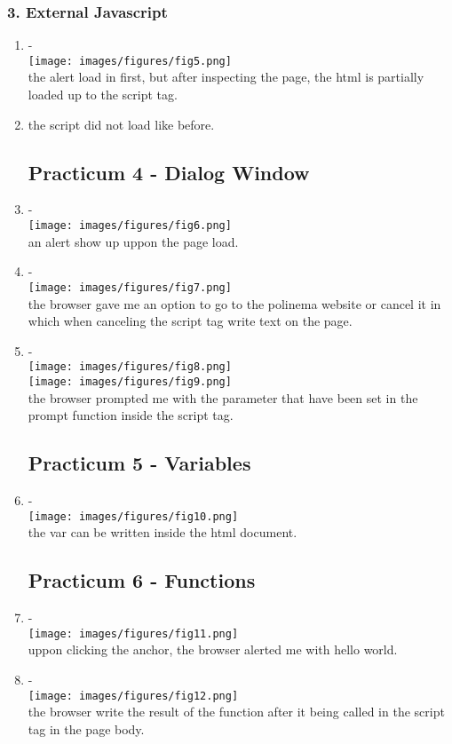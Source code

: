 \documentclass[12pt,titlepage]{article}
\begin{document}
\subsubsection*{3. External Javascript}
\begin{enumerate}
    \item - \\ \texttt{[image: images/figures/fig5.png]} \\ the alert load in first, but after inspecting the page, the html is partially loaded up to the script tag.
    \item the script did not load like before.
    \subsection*{Practicum 4 - Dialog Window}
    \item - \\ \texttt{[image: images/figures/fig6.png]} \\ an alert show up uppon the page load.
    \item - \\ \texttt{[image: images/figures/fig7.png]} \\ the browser gave me an option to go to the polinema website or cancel it in which when canceling the script tag write text on the page.
    \newpage
    \item - \\ \texttt{[image: images/figures/fig8.png]} \\ \texttt{[image: images/figures/fig9.png]} \\ the browser prompted me with the parameter that have been set in the prompt function inside the script tag.
    \subsection*{Practicum 5 - Variables}
    \item - \\ \texttt{[image: images/figures/fig10.png]} \\ the var can be written inside the html document.
    \subsection*{Practicum 6 - Functions}
    \item - \\ \texttt{[image: images/figures/fig11.png]} \\ uppon clicking the anchor, the browser alerted me with hello world.
    \newpage
    \item - \\ \texttt{[image: images/figures/fig12.png]} \\ the browser write the result of the function after it being called in the script tag in the page body.

\end{enumerate}
\end{document}
